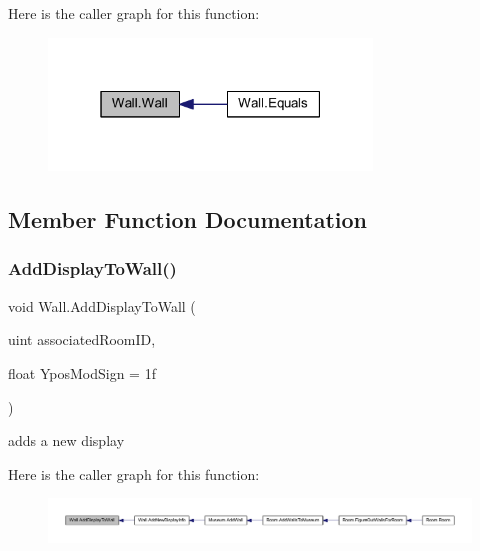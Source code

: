 Here is the caller graph for this function\+:
\nopagebreak
\begin{figure}[H]
\begin{center}
\leavevmode
\includegraphics[width=244pt]{class_wall_a4c5f79551eaa6006ef8d243c6cb4407f_icgraph}
\end{center}
\end{figure}


\subsection{Member Function Documentation}
\mbox{\label{class_wall_a2c2ccc6de461b4979816536859ef591c}} 
\subsubsection{\texorpdfstring{Add\+Display\+To\+Wall()}{AddDisplayToWall()}}
{\footnotesize\ttfamily void Wall.\+Add\+Display\+To\+Wall (\begin{DoxyParamCaption}\item[{uint}]{associated\+Room\+ID,  }\item[{float}]{Ypos\+Mod\+Sign = {\ttfamily 1f} }\end{DoxyParamCaption})\hspace{0.3cm}{\ttfamily [private]}}



adds a new display 

Here is the caller graph for this function\+:
\nopagebreak
\begin{figure}[H]
\begin{center}
\leavevmode
\includegraphics[width=350pt]{class_wall_a2c2ccc6de461b4979816536859ef591c_icgraph}
\end{center}
\end{figure}
\mbox{\label{class_wall_aaed262c3f6b37525136f3278ca2e80cb}} 
